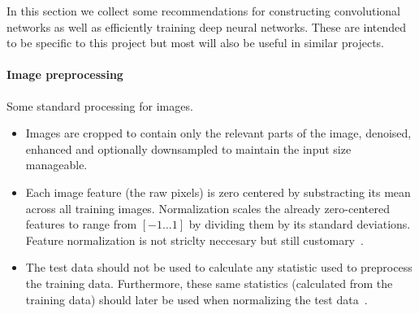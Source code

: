 In this section we collect some recommendations for constructing convolutional networks as well as efficiently training deep neural networks. These are intended to be specific to this project but most will also be useful in similar projects.


\paragraph{Image preprocessing} Some standard processing for images.
\begin{itemize}
	\item Images are cropped to contain only the relevant parts of the image, denoised, enhanced and optionally downsampled to maintain the input size manageable.

	\item Each image feature (the raw pixels) is zero centered by substracting its mean across all training images. Normalization scales the already zero-centered features to range from $[-1 \dots 1]$ by dividing them by its standard deviations. Feature normalization is not striclty neccesary but still customary~\cite{Karpathy2015}.

	\item The test data should not be used to calculate any statistic used to preprocess the training data. Furthermore, these same statistics (calculated from the training data) should later be used when normalizing the test data~\cite{Karpathy2015}.
\end{itemize}

